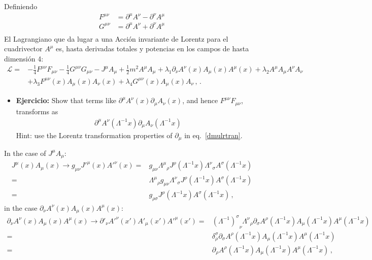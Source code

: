 Definiendo
\begin{align*}
  F^{\mu\nu}&=\partial^\mu A^\nu-\partial^\nu A^\mu\\
  G^{\mu\nu}&=\partial^\mu A^\nu+\partial^\nu A^\mu\\
\end{align*}
El Lagrangiano que da lugar a una Acción invariante de Lorentz para el cuadrivector $A^\mu$
es, hasta derivadas totales y potencias en los campos de hasta dimensión 4:
\begin{align}
  \mathcal{L}=&-\frac{1}{4}F^{\mu\nu}F_{\mu\nu}-\frac{1}{4}G^{\mu\nu}G_{\mu\nu}-J^\mu A_\mu+
 \frac{1}{2}m^2A^\mu A_\mu +\lambda_1\partial_\nu A^\nu(x) A_\mu(x) A^\mu(x)+\lambda_2 A^\mu A_\mu A^\nu A_\nu\nonumber\\
&+\lambda_3 F^{\mu\nu}(x)A_\mu(x) A_\nu(x)+\lambda_4G^{\mu\nu}(x)A_\mu(x) A_\nu\,,\,.
  \label{eq:lagAmu}
\end{align}
\begin{itemize}
\item \textbf{Ejercicio:} Show that terms like $\partial^\mu A^\nu(x)\partial_\mu A_\nu(x)$, and hence $F^{\mu\nu}F_{\mu\nu}$, transforms as
  \begin{align}
    \partial^\mu A^\nu\left(\Lambda^{-1}x\right)\partial_\mu A_\nu\left(\Lambda^{-1}x\right)
  \end{align}
Hint: use the Lorentz transformation properties of $\partial_\mu$ in eq.~\eqref{dmulrtran}.
\end{itemize}
In the case of $J^\mu A_\mu$:
\begin{align}
  J^\mu(x)A_\mu(x)\to g_{\mu\nu}{J'}^\mu(x){A'}^\nu(x)=& g_{\mu\nu}{\Lambda^\mu}_\rho J^\rho\left(\Lambda^{-1}x\right){\Lambda^\nu}_\sigma A^\sigma\left(\Lambda^{-1}x\right)\nonumber\\
=& {\Lambda^\mu}_\rho g_{\mu\nu}{\Lambda^\nu}_\sigma J^\rho\left(\Lambda^{-1}x\right)A^\sigma\left(\Lambda^{-1}x\right)\nonumber\\
=& g_{\rho\sigma}J^\rho\left(\Lambda^{-1}x\right)A^\sigma\left(\Lambda^{-1}x\right)\,,
\end{align}
in the case $\partial_\nu A^\nu(x) A_\mu(x) A^\mu(x)$:
\begin{align}
   \partial_\nu A^\nu(x) A_\mu(x) A^\mu(x)\to {\partial'}_\nu{A'}^\nu(x') {A'}_\mu(x') {A'}^\mu(x')=& {\left(\Lambda^{-1}\right)^\sigma}_\nu{\Lambda^\nu}_\rho\partial_\sigma A^\rho\left(\Lambda^{-1}x\right) A_\mu\left(\Lambda^{-1}x\right) A^\mu\left(\Lambda^{-1}x\right)\nonumber\\
=& \delta^\sigma_\rho\partial_\sigma A^\rho\left(\Lambda^{-1}x\right) A_\mu\left(\Lambda^{-1}x\right) A^\mu\left(\Lambda^{-1}x\right)\nonumber\\
=& \partial_\rho A^\rho\left(\Lambda^{-1}x\right) A_\mu\left(\Lambda^{-1}x\right) A^\mu\left(\Lambda^{-1}x\right)\,,\nonumber\\
\end{align}
